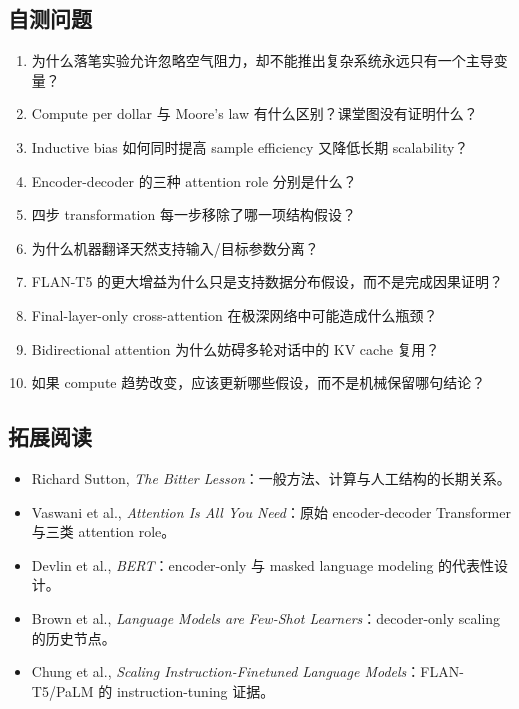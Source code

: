 \subsection{自测问题}

\begin{enumerate}
  \item 为什么落笔实验允许忽略空气阻力，却不能推出复杂系统永远只有一个主导变量？
  \item Compute per dollar 与 Moore's law 有什么区别？课堂图没有证明什么？
  \item Inductive bias 如何同时提高 sample efficiency 又降低长期 scalability？
  \item Encoder-decoder 的三种 attention role 分别是什么？
  \item 四步 transformation 每一步移除了哪一项结构假设？
  \item 为什么机器翻译天然支持输入/目标参数分离？
  \item FLAN-T5 的更大增益为什么只是支持数据分布假设，而不是完成因果证明？
  \item Final-layer-only cross-attention 在极深网络中可能造成什么瓶颈？
  \item Bidirectional attention 为什么妨碍多轮对话中的 KV cache 复用？
  \item 如果 compute 趋势改变，应该更新哪些假设，而不是机械保留哪句结论？
\end{enumerate}

\subsection{拓展阅读}

\begin{itemize}
  \item Richard Sutton, \emph{The Bitter Lesson}：一般方法、计算与人工结构的长期关系。
  \item Vaswani et al., \emph{Attention Is All You Need}：原始 encoder-decoder Transformer 与三类 attention role。
  \item Devlin et al., \emph{BERT}：encoder-only 与 masked language modeling 的代表性设计。
  \item Brown et al., \emph{Language Models are Few-Shot Learners}：decoder-only scaling 的历史节点。
  \item Chung et al., \emph{Scaling Instruction-Finetuned Language Models}：FLAN-T5/PaLM 的 instruction-tuning 证据。
\end{itemize}


